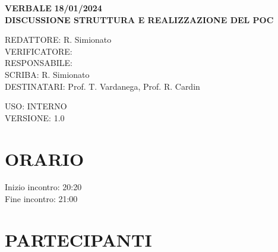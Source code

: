 \documentclass[5pt]{article}
\begin{document}
	\vspace{20pt}
	
	\begin{center}
		\textbf{\large VERBALE }
		\textbf{\large 18/01/2024} \\
		\textbf{\LARGE DISCUSSIONE STRUTTURA E REALIZZAZIONE DEL POC}
	\end{center}
	
	\vspace{13pt}
	
	\begin{flushleft}
		\begin{spacing}{1.5}
			REDATTORE: R. Simionato\\%
			VERIFICATORE: \\%
			RESPONSABILE: \\%
			\vspace{7pt}
			SCRIBA: R. Simionato\\%
			\vspace{7pt}
			DESTINATARI:   Prof. T. Vardanega, Prof. R. Cardin\\%
		\end{spacing}
	\end{flushleft}
	
	\begin{flushright}
		\begin{spacing}{1}
			USO: INTERNO\\
			VERSIONE: 1.0\\
		\end{spacing}
	\end{flushright}
	
	
	\restoregeometry
	
	\pagebreak
	
	
	\section{ORARIO}
	\begin{spacing}{1.5}
		{\large Inizio incontro: 20:20}\\
		{\large Fine incontro: 21:00}
	\end{spacing}
	
	\section{PARTECIPANTI}
	\setlength\cellspacetoplimit{6pt}
	\setlength\cellspacebottomlimit{6pt}
	
\end{document}
